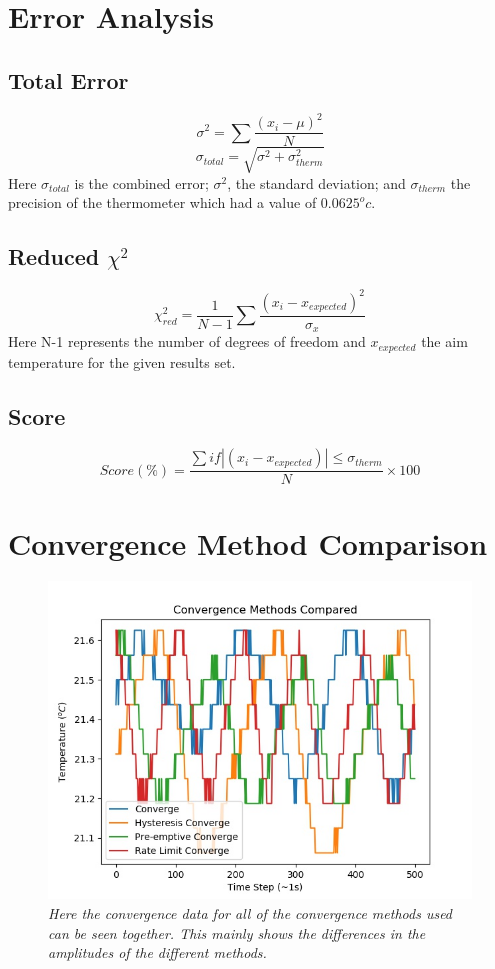 \documentclass[10pt]{article}
\begin{document}
\section{Error Analysis}\label{app:errors}
\subsection{Total Error}
\begin{equation}
    \sigma^2 = \sum \frac{(x_i - \mu)^2}{N}
\end{equation}
\begin{equation}
    \sigma_{total} = \sqrt{\sigma^2 + \sigma_{therm}^2}
\end{equation}
Here $\sigma_{total}$ is the combined error; $\sigma^2$, the standard deviation; and $\sigma_{therm}$ the precision of the thermometer which had a value of $0.0625^oc$.
\subsection{Reduced $\chi^2$}
\begin{equation}
    \chi_{red}^2 = \frac{1}{N-1}\sum \frac{(x_i - x_{expected})^2}{\sigma_{x}}
\end{equation}
Here N-1 represents the number of degrees of freedom and $x_{expected}$ the aim temperature for the given results set.
\subsection{Score}
\begin{equation}
    Score(\%) = \frac{\sum if |(x_i - x_{expected})| \leq \sigma_{therm}}{N}\times 100
\end{equation}
\newpage
\section{Convergence Method Comparison}\label{app:comparison}
\begin{figure}[h!]
    \centering
    \includegraphics[scale=0.75]{comparison.jpg}
    \caption{\it{Here the convergence data for all of the convergence methods used can be seen together. This mainly shows the differences in the amplitudes of the different methods.}}
    \label{fig:comparison}
\end{figure}
\end{document}
